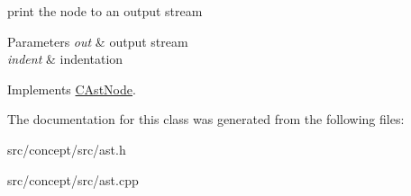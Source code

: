 print the node to an output stream 


\begin{DoxyParams}{Parameters}
{\em out} & output stream \\
\hline
{\em indent} & indentation \\
\hline
\end{DoxyParams}


Implements \hyperlink{classCAstNode_aff4622f85ee405f9b9257f91fb3a830e}{C\-Ast\-Node}.



The documentation for this class was generated from the following files\-:\begin{DoxyCompactItemize}
\item 
src/concept/src/ast.\-h\item 
src/concept/src/ast.\-cpp\end{DoxyCompactItemize}
